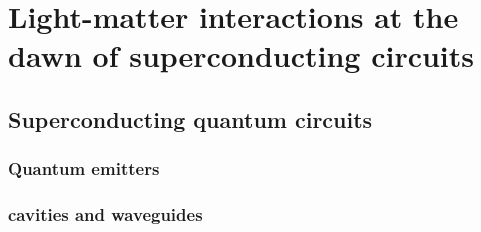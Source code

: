 \cleartoevenpage
\pagestyle{empty}	


\chapter[Abbreviated title]{Light-matter interactions at the dawn of superconducting circuits}
\label{Chap:label}	%
\pagestyle{headings}

\section{Superconducting quantum circuits}
\subsection{Quantum emitters}
\subsection{cavities and waveguides}
\subsection{}
